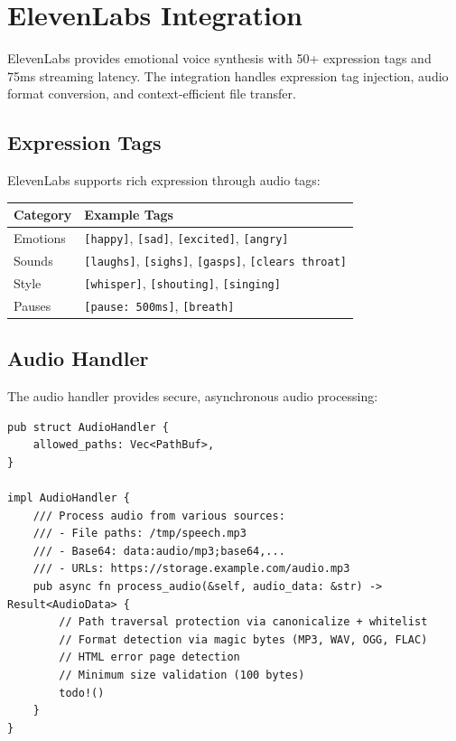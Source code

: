 \documentclass[11pt,letterpaper]{article}
\begin{document}
\section{ElevenLabs Integration}

\begin{tldrbox}
ElevenLabs provides emotional voice synthesis with 50+ expression tags and 75ms streaming latency. The integration handles expression tag injection, audio format conversion, and context-efficient file transfer.
\end{tldrbox}

\subsection{Expression Tags}

ElevenLabs supports rich expression through audio tags:

\begin{center}
\begin{tabular}{ll}
\toprule
\textbf{Category} & \textbf{Example Tags} \\
\midrule
Emotions & \texttt{[happy]}, \texttt{[sad]}, \texttt{[excited]}, \texttt{[angry]} \\
Sounds & \texttt{[laughs]}, \texttt{[sighs]}, \texttt{[gasps]}, \texttt{[clears throat]} \\
Style & \texttt{[whisper]}, \texttt{[shouting]}, \texttt{[singing]} \\
Pauses & \texttt{[pause: 500ms]}, \texttt{[breath]} \\
\bottomrule
\end{tabular}
\end{center}

\subsection{Audio Handler}

The audio handler provides secure, asynchronous audio processing:

\begin{lstlisting}[caption=Audio Handler]
pub struct AudioHandler {
    allowed_paths: Vec<PathBuf>,
}

impl AudioHandler {
    /// Process audio from various sources:
    /// - File paths: /tmp/speech.mp3
    /// - Base64: data:audio/mp3;base64,...
    /// - URLs: https://storage.example.com/audio.mp3
    pub async fn process_audio(&self, audio_data: &str) -> Result<AudioData> {
        // Path traversal protection via canonicalize + whitelist
        // Format detection via magic bytes (MP3, WAV, OGG, FLAC)
        // HTML error page detection
        // Minimum size validation (100 bytes)
        todo!()
    }
}
\end{lstlisting}
\end{document}
